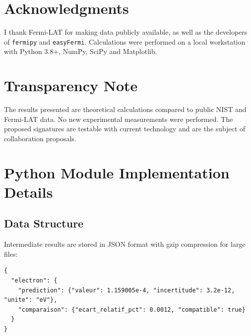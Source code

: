 \documentclass[11pt,a4paper]{article}
\theoremstyle{plain}
\theoremstyle{definition}
\theoremstyle{remark}
\begin{document}
\section*{Acknowledgments}

I thank Fermi-LAT for making data publicly available, as well as the developers of \texttt{fermipy} and \texttt{easyFermi}. Calculations were performed on a local workstation with Python 3.8+, NumPy, SciPy and Matplotlib.

\section*{Transparency Note}

The results presented are theoretical calculations compared to public NIST and Fermi-LAT data. No new experimental measurements were performed. The proposed signatures are testable with current technology and are the subject of collaboration proposals.

\printbibliography

\appendix
\section{Python Module Implementation Details}

\subsection{Data Structure}

Intermediate results are stored in JSON format with gzip compression for large files:
\begin{lstlisting}[caption={Example JSON structure for Zeeman results},label={lst:json}]
{
  "electron": {
    "prediction": {"valeur": 1.159005e-4, "incertitude": 3.2e-12, "unite": "eV"},
    "comparaison": {"ecart_relatif_pct": 0.0012, "compatible": true}
  }
}
\end{lstlisting}
\end{document}
